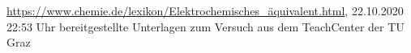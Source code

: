 \documentclass{article}
\begin{document}
%


%


\begin{thebibliography}{9}
 \url{https://www.chemie.de/lexikon/Elektrochemisches_äquivalent.html}, 22.10.2020 22:53 Uhr
 bereitgestellte Unterlagen zum Versuch aus dem TeachCenter der TU Graz
\end{thebibliography}
\end{document}
